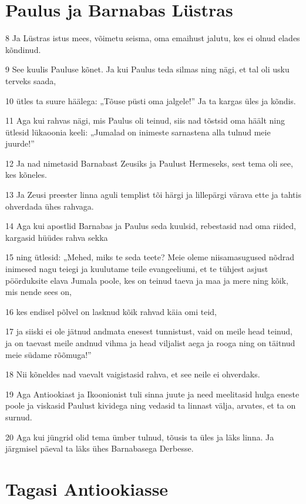 \section*{Paulus ja Barnabas Lüstras}

\par 8 Ja Lüstras istus mees, võimetu seisma, oma emaihust jalutu, kes ei olnud elades kõndinud.
\par 9 See kuulis Pauluse kõnet. Ja kui Paulus teda silmas ning nägi, et tal oli usku terveks saada,
\par 10 ütles ta suure häälega: „Tõuse püsti oma jalgele!” Ja ta kargas üles ja kõndis.
\par 11 Aga kui rahvas nägi, mis Paulus oli teinud, siis nad tõstsid oma häält ning ütlesid lükaoonia keeli: „Jumalad on inimeste sarnastena alla tulnud meie juurde!”
\par 12 Ja nad nimetasid Barnabast Zeusiks ja Paulust Hermeseks, sest tema oli see, kes kõneles.
\par 13 Ja Zeusi preester linna aguli templist tõi härgi ja lillepärgi värava ette ja tahtis ohverdada ühes rahvaga.
\par 14 Aga kui apostlid Barnabas ja Paulus seda kuulsid, rebestasid nad oma riided, kargasid hüüdes rahva sekka
\par 15 ning ütlesid: „Mehed, miks te seda teete? Meie oleme niisamasugused nõdrad inimesed nagu teiegi ja kuulutame teile evangeeliumi, et te tühjest asjust pöörduksite elava Jumala poole, kes on teinud taeva ja maa ja mere ning kõik, mis nende sees on,
\par 16 kes endisel põlvel on lasknud kõik rahvad käia omi teid,
\par 17 ja siiski ei ole jätnud andmata enesest tunnistust, vaid on meile head teinud, ja on taevast meile andnud vihma ja head viljalist aega ja rooga ning on täitnud meie südame rõõmuga!”
\par 18 Nii kõneldes nad vaevalt vaigistasid rahva, et see neile ei ohverdaks.
\par 19 Aga Antiookiast ja Ikoonionist tuli sinna juute ja need meelitasid hulga eneste poole ja viskasid Paulust kividega ning vedasid ta linnast välja, arvates, et ta on surnud.
\par 20 Aga kui jüngrid olid tema ümber tulnud, tõusis ta üles ja läks linna. Ja järgmisel päeval ta läks ühes Barnabasega Derbesse.

\section*{Tagasi Antiookiasse}

